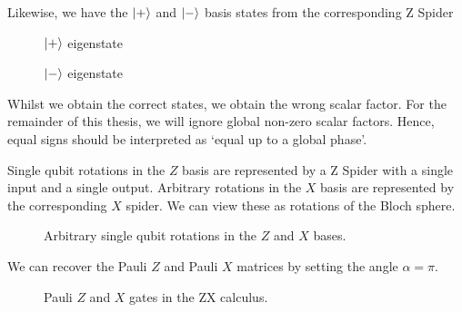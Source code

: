 Likewise, we have the $\ket +$ and $\ket -$ basis states from the corresponding Z Spider
\begin{figure}[H]
\centering
\begin{minipage}{.4\textwidth}
    \centering
    \caption{$\ket +$ eigenstate}
\end{minipage}%
\begin{minipage}{.4\textwidth}
    \centering
    \caption{$\ket -$ eigenstate}
\end{minipage}
\end{figure}

Whilst we obtain the correct states, we obtain the wrong scalar factor. For the remainder of this thesis, we will ignore global non-zero scalar factors. Hence, equal signs should be interpreted as `equal up to a global phase'.

Single qubit rotations in the $Z$ basis are represented by a Z Spider with a single input and a single output. Arbitrary rotations in the $X$ basis are represented by the corresponding $X$ spider. We can view these as rotations of the Bloch sphere.

\begin{figure}[H]
\centering
\caption{Arbitrary single qubit rotations in the $Z$ and $X$ bases.}
\end{figure}

We can recover the Pauli $Z$ and Pauli $X$ matrices by setting the angle $\alpha = \pi$.
\begin{figure}[H]
\centering
{}
\caption{Pauli $Z$ and $X$ gates in the ZX calculus.}
\end{figure}

